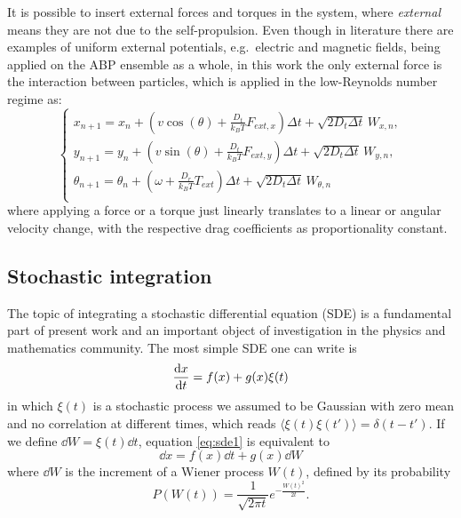 \documentclass[../../master_thesis_np.tex]{subfiles}
\begin{document}
		It is possible to insert external forces and torques in the system, where \emph{external} means they are not due to the self-propulsion. 
		Even though in literature there are examples of uniform external potentials, e.g.\ electric and magnetic fields, being applied on the ABP ensemble as a whole, in this work the only external force is the interaction between particles, which is applied in the low-Reynolds number regime as:
		\begin{equation} \label{eq:fin_diff_with_forces}
			\begin{cases}
				x_{n+1} = x_n + \left( v \cos(\theta) + \frac{D_t}{k_B T} F_{ext,x} \right) \Delta t + \sqrt{2D_t \Delta t} \, W_{x,n},\\
				y_{n+1} = y_n + \left( v \sin(\theta) + \frac{D_t}{k_B T} F_{ext,y} \right) \Delta t + \sqrt{2D_t \Delta t} \, W_{y,n},\\
				\theta_{n+1} = \theta_n +\left(\omega + \frac{D_r}{k_B T}{}T_{ext}\right) \Delta t + \sqrt{2D_t \Delta t} \, W_{\theta,n}\\
			\end{cases}
		\end{equation}
		where applying a force or a torque just linearly translates to a linear or angular velocity change, with the respective drag coefficients as proportionality constant.
		
		\subsection{Stochastic integration}
		The topic of integrating a stochastic differential equation (SDE) is a fundamental part of present work and an important object of investigation in the physics and mathematics community. 
		The most simple SDE one can write is
		\begin{equation} \label{eq:sde1}
			\dv{x}{t} = f(x) + g(x)\xi(t)
		\end{equation}
		in which $\xi(t)$ is a stochastic process we assumed to be Gaussian with zero mean and no correlation at different times, which reads $ \langle \xi(t) \xi(t') \rangle = \delta(t-t')$. 
		If we define  $\dd{W} = \xi(t)\dd{t}$, equation \ref{eq:sde1} is equivalent to
		\begin{equation} \label{eq:sde2}
			\dd{x} = f(x)\dd{t} + g(x)\dd{W} 
		\end{equation} 
		where $\dd{W}$ is the increment of a Wiener process $W(t)$, defined by its probability
		\begin{equation} 
			P(W(t)) = \frac{1}{\sqrt{2 \pi t}} e^{-\frac{W(t)^2}{2t}} .
		\end{equation}
		
\end{document}
